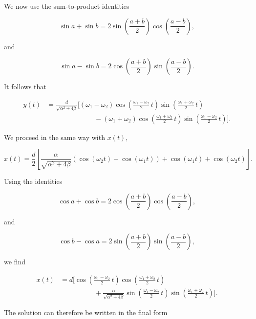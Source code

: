 \documentclass[12pt]{article}
\begin{document}
We now use the sum-to-product identities

\[
  \sin a+\sin b
  =
  2\sin\left(\frac{a+b}{2}\right)
  \cos\left(\frac{a-b}{2}\right),
\]

and

\[
  \sin a-\sin b
  =
  2\cos\left(\frac{a+b}{2}\right)
  \sin\left(\frac{a-b}{2}\right).
\]

It follows that

\[
  \begin{aligned}
    y(t)
    &=
    \frac{d}{\sqrt{\alpha^2+4\beta}}
    \Biggl[
      (\omega_1-\omega_2)
      \cos\left(
        \frac{\omega_1-\omega_2}{2}\,t
      \right)
      \sin\left(
        \frac{\omega_1+\omega_2}{2}\,t
      \right)
      \\
      &\hspace{7em}
      -
      (\omega_1+\omega_2)
      \cos\left(
        \frac{\omega_1+\omega_2}{2}\,t
      \right)
      \sin\left(
        \frac{\omega_1-\omega_2}{2}\,t
      \right)
    \Biggr].
  \end{aligned}
\]

We proceed in the same way with \(x(t)\),

\[
  x(t)
  =
  \frac{d}{2}
  \left[
    \frac{\alpha}{\sqrt{\alpha^2+4\beta}}
    \left(
      \cos(\omega_2t)-\cos(\omega_1t)
    \right)
    +
    \cos(\omega_1t)+\cos(\omega_2t)
  \right].
\]

Using the identities

\[
  \cos a+\cos b
  =
  2\cos\left(\frac{a+b}{2}\right)
  \cos\left(\frac{a-b}{2}\right),
\]

and

\[
  \cos b-\cos a
  =
  2\sin\left(\frac{a+b}{2}\right)
  \sin\left(\frac{a-b}{2}\right),
\]

we find

\[
  \begin{aligned}
    x(t)
    &=
    d
    \Biggl[
      \cos\left(
        \frac{\omega_1-\omega_2}{2}\,t
      \right)
      \cos\left(
        \frac{\omega_1+\omega_2}{2}\,t
      \right)
      \\
      &\hspace{5em}
      +
      \frac{\alpha}{\sqrt{\alpha^2+4\beta}}
      \sin\left(
        \frac{\omega_1-\omega_2}{2}\,t
      \right)
      \sin\left(
        \frac{\omega_1+\omega_2}{2}\,t
      \right)
    \Biggr].
  \end{aligned}
\]

The solution can therefore be written in the final form
\end{document}
